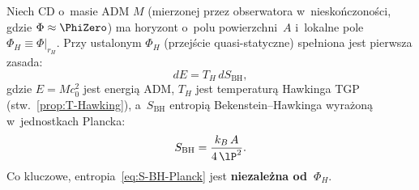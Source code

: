 \begin{theorem}\label{thm:first-law-TGP}
Niech CD o~masie ADM $M$ (mierzonej przez obserwatora
w~niesko\'nczono\'sci, gdzie $\Phi \approx \PhiZero$) ma
horyzont o~polu powierzchni~$A$ i~lokalne pole
$\Phi_H \equiv \Phi\big|_{r_H}$.
Przy ustalonym $\Phi_H$ (przej\'scie quasi-statyczne)
spe\l{}niona jest pierwsza zasada:
\begin{equation}\label{eq:first-law-TGP}
    \boxed{dE = T_H\,dS_{\mathrm{BH}},}
\end{equation}
gdzie $E = Mc_0^2$ jest energi\k{a} ADM,
$T_H$ jest temperatur\k{a} Hawkinga TGP
(stw.~\ref{prop:T-Hawking}), a~$S_{\mathrm{BH}}$ entropi\k{a}
Bekenstein--Hawkinga wyra\.zon\k{a} w~jednostkach Plancka:
\begin{equation}\label{eq:S-BH-Planck}
    S_{\mathrm{BH}} = \frac{k_B\,A}{4\,\lP^2}.
\end{equation}
Co kluczowe, entropia~\eqref{eq:S-BH-Planck} jest
\textbf{niezale\.zna od~$\Phi_H$}.
\end{theorem}


